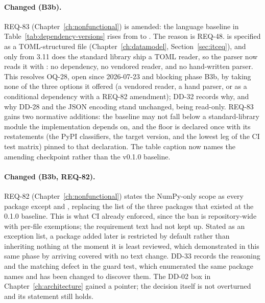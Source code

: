 \paragraph{Changed (B3b).} \stable{} REQ-83
(Chapter~\ref{ch:nonfunctional}) is amended: the language baseline in
Table~\ref{tab:dependency-versions} rises from  to
. The reason is REQ-48.  is specified
as a TOML-structured file (Chapter~\ref{ch:datamodel},
Section~\ref{sec:itceq}), and only from 3.11 does the standard library
ship a TOML reader, so the parser now reads it with :
no dependency, no vendored reader, and no hand-written parser. This
resolves OQ-28, open since 2026-07-23 and blocking phase B3b, by
taking none of the three options it offered (a vendored reader, a hand
parser, or  as a conditional dependency with a REQ-82
amendment); DD-32 records why, and why DD-28 and the JSON
 encoding stand unchanged,  being
read-only. REQ-83 gains two normative additions: the baseline may not
fall below a standard-library module the implementation depends on,
and the floor is declared once with its restatements (the PyPI
classifiers, the  target version, and the lowest leg of the
CI test matrix) pinned to that declaration. The table caption now
names the amending checkpoint rather than the v0.1.0 baseline.

\paragraph{Changed (B3b, REQ-82).} \stable{} REQ-82
(Chapter~\ref{ch:nonfunctional}) states the NumPy-only scope as every
package except  and , replacing the list of the
three packages that existed at the 0.1.0 baseline. This is what CI
already enforced, since the  ban is repository-wide with
per-file exemptions; the requirement text had not kept up. Stated as an
exception list, a package added later is restricted by default rather
than inheriting nothing at the moment it is least reviewed, which
 demonstrated in this same phase by arriving covered with
no text change. DD-33 records the reasoning and the matching defect in
the guard test, which enumerated the same package names and has been
changed to discover them. The DD-02 box in
Chapter~\ref{ch:architecture} gained a pointer; the decision itself is
not overturned and its statement still holds.

